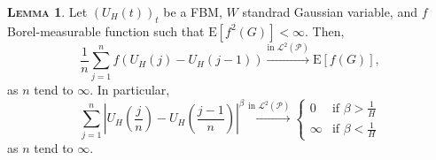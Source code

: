 \documentclass[a4paper, twoside, 11pt]{article}
\theoremstyle{definition}
\newtheorem{lemma}[definition]{\scshape Lemma}
\begin{document}
\begin{lemma}
  Let $(U_H(t))_{t}$ be a FBM, $W$ standrad Gaussian variable, and $f$ Borel-measurable function such that $\mathrm{E}[f^2(G)] < \infty$. Then, 
  \begin{equation*}
	\frac{1}{n}\sum\limits_{j=1}^n f(U_H(j)-U_H(j-1)) \overset{\text{in }\mathcal{L}^2(\mathcal{P})}{\rightarrow} \mathrm{E}[f(G)],
  \end{equation*}
  as $n$ tend to $\infty$. In particular,
  \begin{equation}
	\sum_{j=1}^n |U_H(\frac{j}{n}) - U_H(\frac{j-1}{n})|^\beta \overset{\text{in }\mathcal{L}^2(\mathcal{P})}{\rightarrow} \begin{cases}
	  0 &\mbox{if } \beta > \frac{1}{H}\\
	  \infty &\mbox{if } \beta < \frac{1}{H}
	\end{cases}
	\label{sec:semilemma}
  \end{equation}
  as $n$ tend to $\infty$.
\end{lemma}
\end{document}

